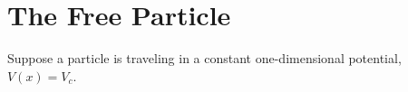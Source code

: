 %
%
%
%

\section*{The Free Particle}

Suppose a particle is traveling in a constant one-dimensional potential, $V(x)=V_c$.
